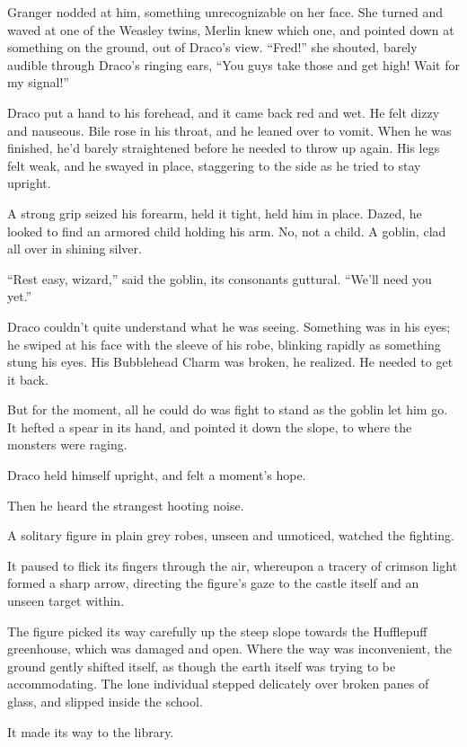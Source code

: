Granger nodded at him, something unrecognizable on her face. She turned
and waved at one of the Weasley twins, Merlin knew which one, and
pointed down at something on the ground, out of Draco's view. ``Fred!''
she shouted, barely audible through Draco's ringing ears, ``You guys
take those and get high! Wait for my signal!''

Draco put a hand to his forehead, and it came back red and wet. He felt
dizzy and nauseous. Bile rose in his throat, and he leaned over to
vomit. When he was finished, he'd barely straightened before he needed
to throw up again. His legs felt weak, and he swayed in place,
staggering to the side as he tried to stay upright.

A strong grip seized his forearm, held it tight, held him in place.
Dazed, he looked to find an armored child holding his arm. No, not a
child. A goblin, clad all over in shining silver.

``Rest easy, wizard,'' said the goblin, its consonants guttural. ``We'll
need you yet.''

Draco couldn't quite understand what he was seeing. Something was in his
eyes; he swiped at his face with the sleeve of his robe, blinking
rapidly as something stung his eyes. His Bubblehead Charm was broken, he
realized. He needed to get it back.

But for the moment, all he could do was fight to stand as the goblin let
him go. It hefted a spear in its hand, and pointed it down the slope, to
where the monsters were raging.

Draco held himself upright, and felt a moment's hope.

Then he heard the strangest hooting noise.

\mybreak

A solitary figure in plain grey robes, unseen and unnoticed, watched the
fighting.

It paused to flick its fingers through the air, whereupon a tracery of
crimson light formed a sharp arrow, directing the figure's gaze to the
castle itself and an unseen target within.

The figure picked its way carefully up the steep slope towards the
Hufflepuff greenhouse, which was damaged and open. Where the way was
inconvenient, the ground gently shifted itself, as though the earth
itself was trying to be accommodating. The lone individual stepped
delicately over broken panes of glass, and slipped inside the school.

It made its way to the library.
